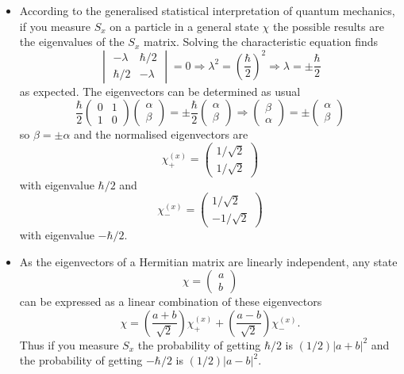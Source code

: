 \documentclass{article}
\begin{document}
\begin{itemize}
  \item According to the generalised statistical interpretation of quantum mechanics, if you measure $S_x$ on a particle in a general state $\chi$ the possible results are the eigenvalues of the $S_x$ matrix. Solving the characteristic equation finds \[\begin{vmatrix}
            -\lambda  & \hbar / 2 \\
            \hbar / 2 & -\lambda
          \end{vmatrix} = 0 \Rightarrow \lambda^2 = \left( \frac{\hbar}{2} \right)^2 \Rightarrow \lambda = \pm \frac{\hbar}{2}\] as expected. The eigenvectors can be determined as usual \[\frac{\hbar}{2} \begin{pmatrix}
            0 & 1 \\
            1 & 0
          \end{pmatrix} \begin{pmatrix}
            \alpha \\
            \beta
          \end{pmatrix} = \pm \frac{\hbar}{2} \begin{pmatrix}
            \alpha \\
            \beta
          \end{pmatrix} \Rightarrow \begin{pmatrix}
            \beta \\
            \alpha
          \end{pmatrix} = \pm \begin{pmatrix}
            \alpha \\
            \beta
          \end{pmatrix}\] so $\beta = \pm \alpha$ and the normalised eigenvectors are \[\chi_+^{(x)} = \begin{pmatrix}
            1 / \sqrt{2} \\
            1 / \sqrt{2}
          \end{pmatrix}\] with eigenvalue $\hbar / 2$ and \[\chi_-^{(x)} = \begin{pmatrix}
            1 / \sqrt{2} \\
            -1 / \sqrt{2}
          \end{pmatrix}\] with eigenvalue $-\hbar / 2$.

  \item As the eigenvectors of a Hermitian matrix are linearly independent, any state \[\chi = \begin{pmatrix}
            a \\
            b
          \end{pmatrix}\] can be expressed as a linear combination of these eigenvectors \[\chi = \left( \frac{a + b}{\sqrt{2}} \right) \chi_+^{(x)} + \left( \frac{a - b}{\sqrt{2}} \right) \chi_-^{(x)}.\] Thus if you measure $S_x$ the probability of getting $\hbar / 2$ is $(1 / 2) |a + b|^2$ and the probability of getting $-\hbar / 2$ is $(1 / 2) |a - b|^2$.
\end{itemize}
\end{document}
